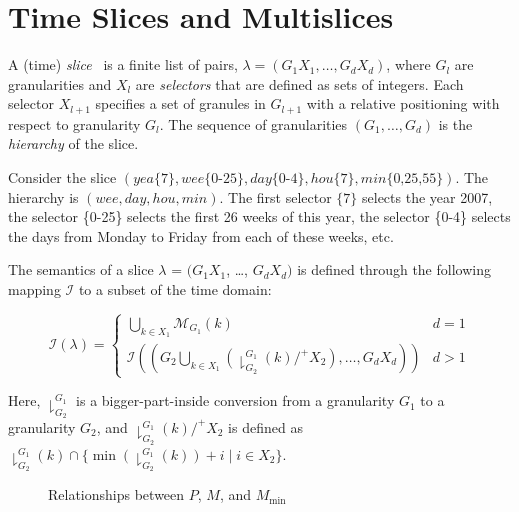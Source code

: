 \documentclass[abstracton,12pt]{scrreprt}
\begin{document}
\section{Time Slices and Multislices}

A (time) \emph{slice}~\cite{Niezette92} is a finite list of pairs,
$\lambda = (G_1X_1,\ldots,G_dX_d)$, where $G_l$ are granularities and
$X_l$ are \emph{selectors} that are defined as sets of integers.  Each
selector $X_{l+1}$ specifies a set of granules in $G_{l+1}$ with a
relative positioning with respect to granularity $G_l$.  The sequence
of granularities $(G_1,\ldots,G_d)$ is the \emph{hierarchy} of the
slice.  

Consider the slice $(\mathit{yea}\{7\}, \mathit{wee}\{\text{0-25}\},
\mathit{day}\{\text{0-4}\}, \mathit{hou}\{7\},
\mathit{min}\{\text{0,25,55}\})$.  The hierarchy is $(\mathit{wee},
\mathit{day}, \mathit{hou}, \mathit{min})$.  The first selector
$\{7\}$ selects the year 2007, the selector \{0-25\} selects the first
26 weeks of this year, the selector \{0-4\} selects the days from
Monday to Friday from each of these weeks, etc.

The semantics of a slice $\lambda$ = $(G_1X_1$, \ldots, $G_dX_d)$ is
defined through the following mapping $\mathcal{I}$ to a subset of the
time domain:

\begin{equation*}
  \mathcal{I} (\lambda) =
  \begin{cases}
    \bigcup_{k \in X_1} \mathcal{M}_{G_1}(k) & d=1 \\[1ex]
    \mathcal{I} \left( (G_2\bigcup_{k \in X_1}(
      \downharpoonright^{G_1}_{G_2}(k)/^+X_2), \ldots, G_dX_d)
    \right) & d>1
  \end{cases}
\end{equation*}

Here, $\downharpoonright^{G_1}_{G_2}$ is a bigger-part-inside
conversion from a granularity $G_1$ to a granularity $G_2$, and
$\downharpoonright^{G_1}_{G_2}(k)/^+X_2$ is defined as
$\downharpoonright^{G_1}_{G_2}(k) \cap \{
\min(\downharpoonright^{G_1}_{G_2}(k)) + i \mid i \in X_2 \}$.

\begin{figure}[htbp]\centering
  \caption{Relationships between $P$, $M$, and $M_\mathrm{min}$}
  \label{fig:ch2-singular-minimal-mapping}
\end{figure}
\end{document}
